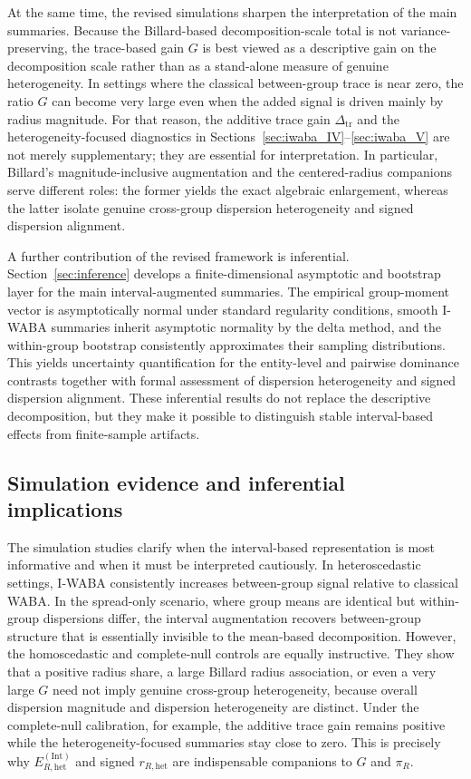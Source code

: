 \documentclass[preprint, times, 12pt, authoryear]{elsarticle}
\begin{document}
At the same time, the revised simulations sharpen the interpretation of the main summaries. Because the Billard-based decomposition-scale total is not variance-preserving, the trace-based gain $G$ is best viewed as a descriptive gain on the decomposition scale rather than as a stand-alone measure of genuine heterogeneity. In settings where the classical between-group trace is near zero, the ratio $G$ can become very large even when the added signal is driven mainly by radius magnitude. For that reason, the additive trace gain $\Delta_{\mathrm{tr}}$ and the heterogeneity-focused diagnostics in Sections~\ref{sec:iwaba_IV}--\ref{sec:iwaba_V} are not merely supplementary; they are essential for interpretation. In particular, Billard's magnitude-inclusive augmentation and the centered-radius companions serve different roles: the former yields the exact algebraic enlargement, whereas the latter isolate genuine cross-group dispersion heterogeneity and signed dispersion alignment.

A further contribution of the revised framework is inferential. Section~\ref{sec:inference} develops a finite-dimensional asymptotic and bootstrap layer for the main interval-augmented summaries. The empirical group-moment vector is asymptotically normal under standard regularity conditions, smooth I-WABA summaries inherit asymptotic normality by the delta method, and the within-group bootstrap consistently approximates their sampling distributions. This yields uncertainty quantification for the entity-level and pairwise dominance contrasts together with formal assessment of dispersion heterogeneity and signed dispersion alignment. These inferential results do not replace the descriptive decomposition, but they make it possible to distinguish stable interval-based effects from finite-sample artifacts.

\subsection{Simulation evidence and inferential implications}

The simulation studies clarify when the interval-based representation is most informative and when it must be interpreted cautiously. In heteroscedastic settings, I-WABA consistently increases between-group signal relative to classical WABA. In the spread-only scenario, where group means are identical but within-group dispersions differ, the interval augmentation recovers between-group structure that is essentially invisible to the mean-based decomposition. However, the homoscedastic and complete-null controls are equally instructive. They show that a positive radius share, a large Billard radius association, or even a very large $G$ need not imply genuine cross-group heterogeneity, because overall dispersion magnitude and dispersion heterogeneity are distinct. Under the complete-null calibration, for example, the additive trace gain remains positive while the heterogeneity-focused summaries stay close to zero. This is precisely why $E_{R,\mathrm{het}}^{(\mathrm{Int})}$ and signed $r_{R,\mathrm{het}}$ are indispensable companions to $G$ and $\pi_R$.
\end{document}
